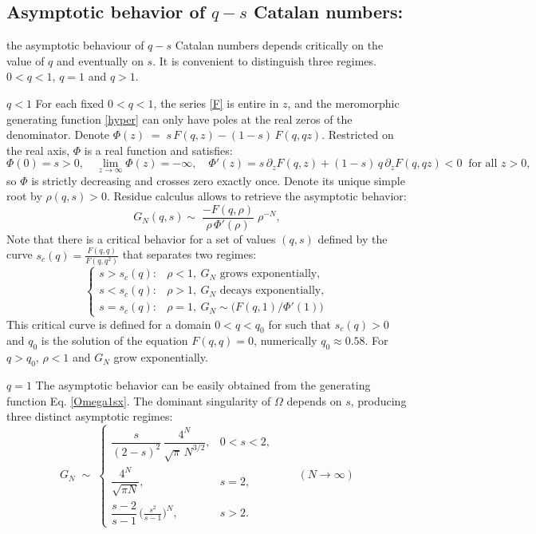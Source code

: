 \documentclass[pdflatex,sn-mathphys-num]{sn-jnl}
\theoremstyle{definition}
\theoremstyle{remark}
\numberwithin{equation}{section}
\begin{document}
\subsection{Asymptotic behavior of $q\!-\!s$ Catalan numbers:}
the asymptotic behaviour of $q\!-\!s$ Catalan numbers depends critically  on the value of $q$ and eventually on $s$. It is convenient to distinguish three regimes. $0<q<1$, $q=1$ and $q>1$.

\noindent
$\boxed{q < 1}$
For each fixed \(0<q<1\), the series \ref{F}
is entire in \(z\), and the meromorphic generating function \ref{hyper}
can only have poles at the real zeros of the denominator. Denote $\Phi(z)\;=\;s\,F(q,z)-(1-s)\,F(q,qz)$. Restricted on the real axis, $\Phi$ is a real function and satisfies:
$$\Phi(0)=s>0,
\quad
\lim_{z\to\infty}\Phi(z)=-\infty,
\quad
\Phi'(z)
=s\,\partial_zF(q,z)+(1-s)\,q\,\partial_zF(q,qz)<0\ \text{ for all } z>0,$$
so \(\Phi\) is strictly decreasing and crosses zero exactly once.
Denote its unique simple root by \(\rho(q,s)>0\). 
Residue calculus allows to retrieve the asymptotic behavior:
\[
G_N(q,s)\sim\;
\frac{-F(q,\rho)}{\rho\,\Phi'(\rho)}\;\rho^{-N},
\]
Note that there is a critical behavior for a set of values $(q,s)$ defined by the curve
\(\displaystyle s_c(q)=\frac{F(q,q)}{F(q,q^2)}\)
that
separates two regimes:
\[
\begin{cases}
s>s_c(q): & \rho<1,\ G_N\text{ grows exponentially},\\
s<s_c(q): & \rho>1,\ G_N\text{ decays exponentially},\\
s=s_c(q): & \rho=1,\ G_N\sim\bigl(F(q,1)/\Phi'(1)\bigr)
\end{cases}
\]
This critical curve is defined for a domain $0 < q <  q_0$ for such that $s_c(q) > 0$ and $q_0$ is the solution of the equation $F(q,q) = 0$, numerically $q_0 \approx 0.58$. For $q>q_0$, $\rho<1$ and $G_N$ grow exponentially.


\noindent
$\boxed{q = 1}$ The asymptotic behavior can be easily obtained from the generating function Eq. \ref{Omega1sx}. The dominant singularity of \(\Omega\) depends on \(s\), producing three
distinct asymptotic regimes:
\[
  G_N \;\sim\;
  \begin{cases}
    \displaystyle
    \dfrac{s}{(2-s)^{2}}\,
    \dfrac{4^{N}}{\sqrt{\pi}\,N^{3/2}},
      & 0<s<2,\\[1.1em]
    \displaystyle
    \dfrac{4^{N}}{\sqrt{\pi N}},
      & s=2,\\[1.1em]
    \displaystyle
    \dfrac{s-2}{s-1}\,
    \bigl(\tfrac{s^{2}}{s-1}\bigr)^{N},
      & s>2.
  \end{cases}
  \qquad(N\to\infty)
\]
\end{document}
